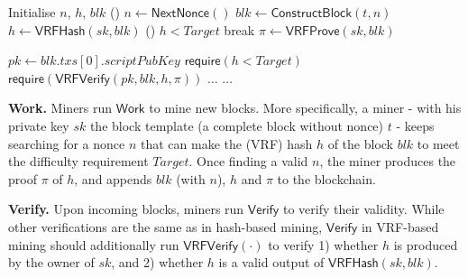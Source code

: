 \documentclass[a0,portrait]{a0poster}
\begin{document}
\begin{multicols}{2}
\vspace{1cm}
\begin{algorithm}[H]
    \caption{$\mathsf{Work}(sk, t, Target)$.}
    \label{algo:work}
    \SetAlgoLined\DontPrintSemicolon
    Initialise $n$, $h$, $blk$ 
    \While () {$n \gets \mathsf{NextNonce}()$}{
        $blk \gets \mathsf{ConstructBlock}(t, n)$ 
        $h \gets \mathsf{VRFHash}(sk, blk)$ 
        \If () {$h < Target$}{
            break 
        }
    }
    $\pi \gets \mathsf{VRFProve}(sk, blk)$ 
     
\end{algorithm}


\begin{algorithm}[H]
    \caption{$\mathsf{Verify}(blk, h, \pi, Target)$}
    \label{algo:verify}
    \SetAlgoLined\DontPrintSemicolon
    $pk \gets blk . txs[0] . scriptPubKey$ 
    $\mathsf{require}(h < Target)$ 
    $\mathsf{require}(\mathsf{VRFVerify}(pk, blk, h, \pi))$ \;
    $\dots$ 
    $\dots$ 
\end{algorithm}
\vspace{1cm}

\textbf{Work.}
Miners run $\mathsf{Work}$ to mine new blocks.
More specifically, a miner - with his private key $sk$ the block template (a complete block without nonce) $t$ - keeps searching for a nonce $n$ that can make the (VRF) hash $h$ of the block $blk$ to meet the difficulty requirement $Target$.
Once finding a valid $n$, the miner produces the proof $\pi$ of $h$, and appends $blk$ (with $n$), $h$ and $\pi$ to the blockchain.

\textbf{Verify.}
Upon incoming blocks, miners run $\mathsf{Verify}$ to verify their validity.
While other verifications are the same as in hash-based mining, $\mathsf{Verify}$ in VRF-based mining should additionally run $\mathsf{VRFVerify}(\cdot)$ to verify 1) whether $h$ is produced by the owner of $sk$, and 2) whether $h$ is a valid output of $\mathsf{VRFHash}(sk, blk)$.


\end{multicols}
\end{document}

